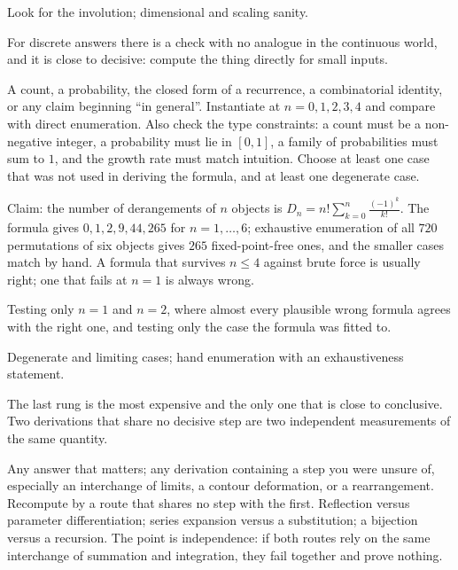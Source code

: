 \begin{seealsob}Look for the involution; dimensional and scaling sanity.\end{seealsob}

For discrete answers there is a check with no analogue in the continuous world, and it is close to decisive: compute the thing directly for small inputs.

\cue A count, a probability, the closed form of a recurrence, a combinatorial identity, or any claim beginning ``in general''.
\method Instantiate at $n=0,1,2,3,4$ and compare with direct enumeration. Also check the type constraints: a count must be a non-negative integer, a probability must lie in $[0,1]$, a family of probabilities must sum to $1$, and the growth rate must match intuition. Choose at least one case that was not used in deriving the formula, and at least one degenerate case.

\begin{worked}
Claim: the number of derangements of $n$ objects is $D_{n}=n!\sum_{k=0}^{n}\frac{(-1)^{k}}{k!}$. The formula gives $0,1,2,9,44,265$ for $n=1,\dots,6$; exhaustive enumeration of all $720$ permutations of six objects gives $265$ fixed-point-free ones, and the smaller cases match by hand. A formula that survives $n\leq 4$ against brute force is usually right; one that fails at $n=1$ is always wrong.
\end{worked}

\begin{trap}
Testing only $n=1$ and $n=2$, where almost every plausible wrong formula agrees with the right one, and testing only the case the formula was fitted to.
\end{trap}

\begin{seealsob}Degenerate and limiting cases; hand enumeration with an exhaustiveness statement.\end{seealsob}

The last rung is the most expensive and the only one that is close to conclusive. Two derivations that share no decisive step are two independent measurements of the same quantity.

\cue Any answer that matters; any derivation containing a step you were unsure of, especially an interchange of limits, a contour deformation, or a rearrangement.
\method Recompute by a route that shares no step with the first. Reflection versus parameter differentiation; series expansion versus a substitution; a bijection versus a recursion. The point is independence: if both routes rely on the same interchange of summation and integration, they fail together and prove nothing.

